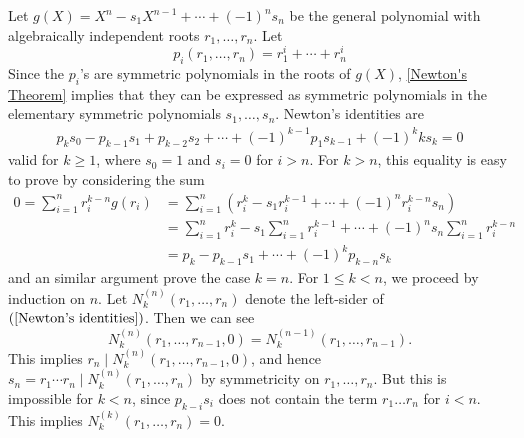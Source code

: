 \begin{example}
Let $g(X)=X^n-s_1X^{n-1}+\cdots+(-1)^ns_n$ be the general polynomial with algebraically independent roots $r_1,\dots,r_n$. Let
\[p_i(r_1,\dots,r_n)=r_1^i+\cdots+r_n^i\]
Since the $p_i$'s are symmetric polynomials in the roots of $g(X)$, \cref{Newton's Theorem} implies that they can be expressed as symmetric polynomials in the elementary symmetric polynomials $s_1,\dots,s_n$. Newton's identities are
\begin{align}\label{Newton's identities}
p_ks_0-p_{k-1}s_1+p_{k-2}s_2+\cdots+(-1)^{k-1}p_1s_{k-1}+(-1)^kks_k=0
\end{align}
valid for $k\geq 1$, where $s_0=1$ and $s_i=0$ for $i>n$. For $k>n$, this equality is easy to prove by considering the sum
\begin{align*}
0=\sum_{i=1}^{n}r_i^{k-n}g(r_i)&=\sum_{i=1}^{n}(r_i^{k}-s_1r_i^{k-1}+\cdots+(-1)^nr_i^{k-n}s_n)\\
&=\sum_{i=1}^{n}r_i^k-s_1\sum_{i=1}^{n}r_i^{k-1}+\cdots+(-1)^ns_n\sum_{i=1}^{n}r_i^{k-n}\\
&=p_k-p_{k-1}s_1+\cdots+(-1)^kp_{k-n}s_k
\end{align*}
and an similar argument prove the case $k=n$. For $1\leq k<n$, we proceed by induction on $n$. Let $N_k^{(n)}(r_1,\dots,r_n)$ denote the left-sider of $(\ref{Newton's identities})$. Then we can see
\[N^{(n)}_k(r_1,\dots,r_{n-1},0)=N^{(n-1)}_k(r_1,\dots,r_{n-1}).\]
This implies $r_n\mid N^{(n)}_k(r_1,\dots,r_{n-1},0)$, and hence $s_n=r_1\cdots r_n\mid N^{(n)}_k(r_1,\dots,r_n)$ by symmetricity on $r_1,\dots,r_n$. But this is impossible for $k<n$, since $p_{k-i}s_i$ does not contain the term $r_1\dots r_n$ for $i<n$. This implies $N_k^{(k)}(r_1,\dots,r_n)=0$. 
\end{example}
\begin{example}

\end{example}
